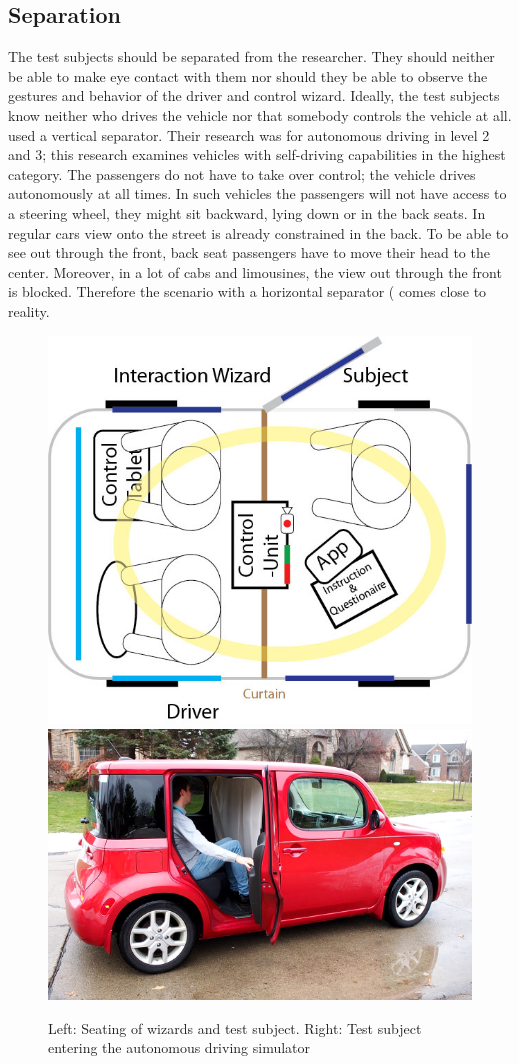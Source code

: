 \subsection{Separation}
The test subjects should be separated from the researcher. They should neither be able to make eye contact with them nor should they be able to observe the gestures and behavior of the driver and control wizard. Ideally, the test subjects know neither who drives the vehicle nor that somebody controls the vehicle at all. \cite{Baltodano2015} used a vertical separator. Their research was for autonomous driving in level 2 and 3; this research examines vehicles with self-driving capabilities in the highest category. The passengers do not have to take over control; the vehicle drives autonomously at all times. In such vehicles the passengers will not have access to a steering wheel, they might sit backward, lying down or in the back seats. In regular cars view onto the street is already constrained in the back. To be able to see out through the front, back seat passengers have to move their head to the center. Moreover, in a lot of cabs and limousines, the view out through the front is blocked. Therefore the scenario with a horizontal separator ( comes close to reality. 
\begin{figure}
    \includegraphics[height=0.38\textwidth]{fig/test-setup-hori}\hfill\includegraphics[height=0.35\textwidth]{fig/enter.png}
    \caption[Driving Simulator]{Left: Seating of wizards and test subject. Right: Test subject entering the autonomous driving simulator}
    \label{fig:testsetup}
\end{figure}


